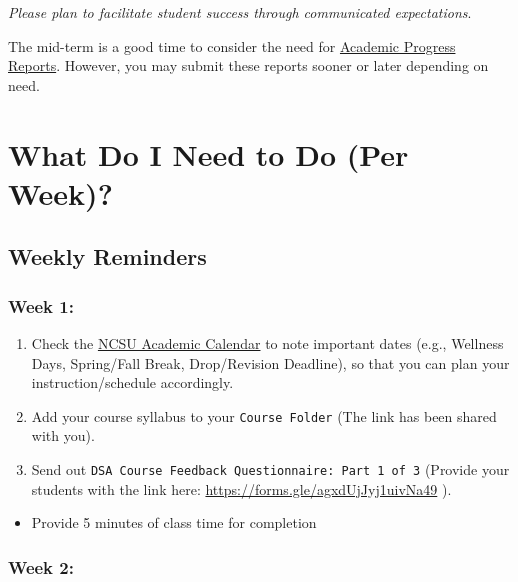 \documentclass[
]{book}
\providecommand{\tightlist}{%
  \setlength{\itemsep}{0pt}\setlength{\parskip}{0pt}}
\begin{document}
{ \emph{Please plan to facilitate student success through communicated expectations}. }

The mid-term is a good time to consider the need for \href{https://dasa.ncsu.edu/faculty-resources/academic-progress-reporting/}{Academic Progress Reports}. However, you may submit these reports sooner or later depending on need.

\hfill\break

\hypertarget{what-do-i-need-to-do-per-week}{%
\chapter{What Do I Need to Do (Per Week)?}\label{what-do-i-need-to-do-per-week}}

\hypertarget{weekly-reminders}{%
\section{Weekly Reminders}\label{weekly-reminders}}

\hypertarget{week-1}{%
\subsection{Week 1:}\label{week-1}}

\begin{enumerate}
\def\labelenumi{\arabic{enumi})}
\item
  Check the \href{https://studentservices.ncsu.edu/calendars/academic/}{NCSU Academic Calendar} to note important dates (e.g., Wellness Days, Spring/Fall Break, Drop/Revision Deadline), so that you can plan your instruction/schedule accordingly.
\item
  Add your course syllabus to your \texttt{Course\ Folder} (The link has been shared with you).
\item
  Send out \texttt{DSA\ Course\ Feedback\ Questionnaire:\ Part\ 1\ of\ 3} (Provide your students with the link here: \url{https://forms.gle/agxdUjJyj1uivNa49} ).
\end{enumerate}

\begin{itemize}
\tightlist
\item
  Provide 5 minutes of class time for completion
\end{itemize}

\hypertarget{week-2}{%
\subsection{Week 2:}\label{week-2}}
\end{document}
